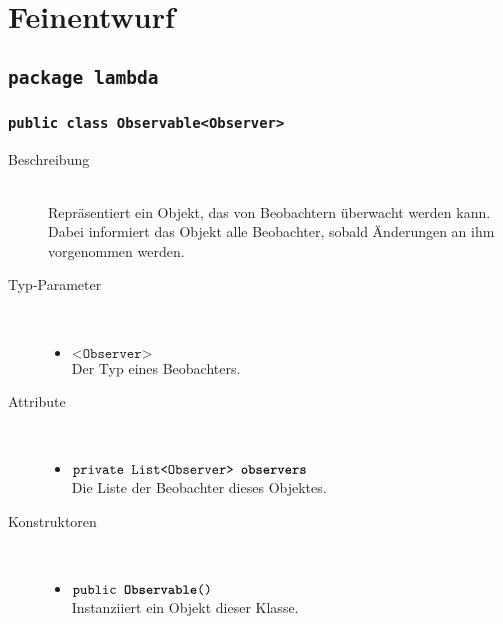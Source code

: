 \section{Feinentwurf}

\subsection{\texttt{package lambda}}

\subsubsection{\normalfont \texttt{public class \textbf{Observable}<Observer>}}

\begin{description}
\item[Beschreibung] \hfill \\ Repräsentiert ein Objekt, das von Beobachtern überwacht werden kann. Dabei informiert das Objekt alle Beobachter, sobald Änderungen an ihm vorgenommen werden.

\item[Typ-Parameter] \hfill \\
	\vspace{-.8cm}
	\begin{itemize}
		\item $\texttt{<Observer>}$ \\ Der Typ eines Beobachters.
	\end{itemize}

\item[Attribute] \hfill \\
	\vspace{-.8cm}
	\begin{itemize}
		\item $\texttt{private List<Observer> \textbf{observers}}$ \\ Die Liste der Beobachter dieses Objektes.
	\end{itemize}
	
\item[Konstruktoren] \hfill \\
	\vspace{-.8cm}
	\begin{itemize}
		\item $\texttt{public \textbf{Observable}()}$ \\ Instanziiert ein Objekt dieser Klasse.
	\end{itemize}
	

\end{description}
